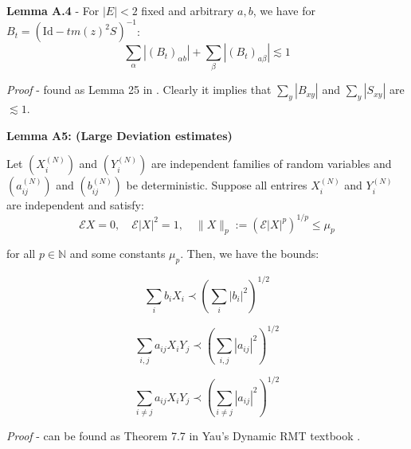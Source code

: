 \documentclass[11pt]{article}
\newenvironment{boxtheorem}[1]
  {\begin{mdframed}\noindent\textbf{#1}\itshape\space}
  {\end{mdframed}}
\newenvironment{boxt}[1]
  {\begin{mdframed}\noindent\textbf{#1}\normalfont\space}
  {\end{mdframed}}
\newcommand{\E}{\mathcal{E}}
\newcommand{\N}{\mathbb{N}}
\begin{document}
\begin{boxt}{Lemma A.4} \label{lemma-a4} - For $|E|<2$ fixed and arbitrary $a, b$, we have for $B_t  =(\text{Id} - tm(z)^2S)^{-1}$: $$\sum_\alpha |(B_t)_{\alpha b}| + \sum_{\beta}|(B_t)_{a\beta}|\lesssim 1$$
 \end{boxt}
 \textit{Proof} - found as Lemma 25 in \cite{bandSDE}. Clearly it implies that $\sum_y |B_{xy}|$ and $\sum_y |S_{xy}|$ are $\lesssim 1$.  


 
  

\begin{boxtheorem}{Lemma A5: (Large Deviation estimates)}    \label{lemma-a5}

  

Let $\left(X_i^{(N)}\right)$ and $\left(Y_i^{(N)}\right)$ are independent families of random variables and $\left(a_{ij}^{(N)}\right)$ and $\left(b_{ij}^{(N)}\right)$ be deterministic. Suppose all entrires $X_{i}^{(N)}$ and $Y_{i}^{(N)}$ are independent and satisfy: $$\E X = 0, \quad \E |X|^2=1, \quad \|X\|_p:=(\E |X|^p)^{1/p}\leq \mu_p$$

for all $p\in \N$ and some constants $\mu_p$. Then, we have the bounds: 

\begin{equation*}\sum_i b_i X_i \prec \left(\sum_i |b_i|^2\right)^{1/2}\tag{1.1}\end{equation*}

\begin{equation*}\sum_{i, j} a_{ij}X_iY_j \prec \left(\sum_{i,j} |a_{ij}|^2\right)^{1/2}\tag{1.2}\end{equation*}

\begin{equation*}\sum_{i\neq j} a_{ij}X_iY_j \prec \left(\sum_{i\neq j} |a_{ij}|^2\right)^{1/2}\tag{1.3}\end{equation*}

\end{boxtheorem}
\textit{Proof} - can be found as Theorem 7.7 in Yau's Dynamic RMT textbook \cite{dynamic}. 
\end{document}
